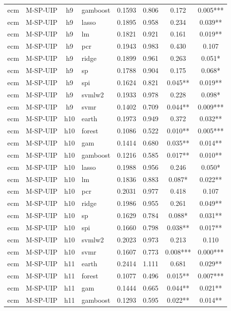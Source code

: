 \begin{ThreePartTable}
\begin{longtable}[t]{llclcccc}
ecm & M-SP-UIP & h9 & gamboost & 0.1593 & 0.806 & 0.172 & 0.005***\\
ecm & M-SP-UIP & h9 & lasso & 0.1895 & 0.958 & 0.234 & 0.039**\\
ecm & M-SP-UIP & h9 & lm & 0.1821 & 0.921 & 0.161 & 0.019**\\
ecm & M-SP-UIP & h9 & pcr & 0.1943 & 0.983 & 0.430 & 0.107\\
ecm & M-SP-UIP & h9 & ridge & 0.1899 & 0.961 & 0.263 & 0.051*\\
ecm & M-SP-UIP & h9 & sp & 0.1788 & 0.904 & 0.175 & 0.068*\\
ecm & M-SP-UIP & h9 & spi & 0.1624 & 0.821 & 0.045** & 0.019**\\
ecm & M-SP-UIP & h9 & svmlw2 & 0.1933 & 0.978 & 0.228 & 0.098*\\
ecm & M-SP-UIP & h9 & svmr & 0.1402 & 0.709 & 0.044** & 0.009***\\
\addlinespace
ecm & M-SP-UIP & h10 & earth & 0.1973 & 0.949 & 0.372 & 0.032**\\
ecm & M-SP-UIP & h10 & forest & 0.1086 & 0.522 & 0.010** & 0.005***\\
ecm & M-SP-UIP & h10 & gam & 0.1414 & 0.680 & 0.035** & 0.014**\\
ecm & M-SP-UIP & h10 & gamboost & 0.1216 & 0.585 & 0.017** & 0.010**\\
ecm & M-SP-UIP & h10 & lasso & 0.1988 & 0.956 & 0.246 & 0.050*\\
ecm & M-SP-UIP & h10 & lm & 0.1836 & 0.883 & 0.087* & 0.022**\\
ecm & M-SP-UIP & h10 & pcr & 0.2031 & 0.977 & 0.418 & 0.107\\
ecm & M-SP-UIP & h10 & ridge & 0.1986 & 0.955 & 0.261 & 0.049**\\
ecm & M-SP-UIP & h10 & sp & 0.1629 & 0.784 & 0.088* & 0.031**\\
ecm & M-SP-UIP & h10 & spi & 0.1660 & 0.798 & 0.038** & 0.017**\\
ecm & M-SP-UIP & h10 & svmlw2 & 0.2023 & 0.973 & 0.213 & 0.110\\
ecm & M-SP-UIP & h10 & svmr & 0.1607 & 0.773 & 0.008*** & 0.000***\\
\addlinespace
ecm & M-SP-UIP & h11 & earth & 0.2414 & 1.111 & 0.681 & 0.029**\\
ecm & M-SP-UIP & h11 & forest & 0.1077 & 0.496 & 0.015** & 0.007***\\
ecm & M-SP-UIP & h11 & gam & 0.1444 & 0.665 & 0.044** & 0.021**\\
ecm & M-SP-UIP & h11 & gamboost & 0.1293 & 0.595 & 0.022** & 0.014**\\

\end{longtable}
\end{ThreePartTable}
